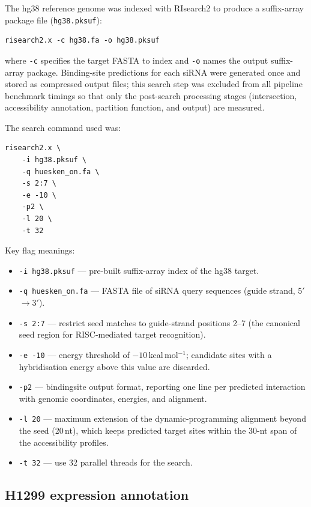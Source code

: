 \documentclass[11pt]{article}
\begin{document}
The hg38 reference genome was indexed with RIsearch2 to produce a suffix-array package file (\texttt{hg38.pksuf}):

\begin{verbatim}
risearch2.x -c hg38.fa -o hg38.pksuf
\end{verbatim}

\noindent where \texttt{-c} specifies the target FASTA to index and \texttt{-o} names the output suffix-array package.
Binding-site predictions for each siRNA were generated once and stored as compressed output files; this search step was excluded from all pipeline benchmark timings so that only the post-search processing stages (intersection, accessibility annotation, partition function, and output) are measured.

The search command used was:

\begin{verbatim}
risearch2.x \
    -i hg38.pksuf \
    -q huesken_on.fa \
    -s 2:7 \
    -e -10 \
    -p2 \
    -l 20 \
    -t 32
\end{verbatim}

\noindent Key flag meanings:
\begin{itemize}
  \item \texttt{-i hg38.pksuf} — pre-built suffix-array index of the
    hg38 target.
  \item \texttt{-q huesken\_on.fa} — FASTA file of siRNA query
    sequences (guide strand, 5$'$$\to$3$'$).
  \item \texttt{-s 2:7} — restrict seed matches to guide-strand positions
    2--7 (the canonical seed region for RISC-mediated target recognition).
  \item \texttt{-e -10} — energy threshold of $-10$\,kcal\,mol$^{-1}$;
    candidate sites with a hybridisation energy above this value are
    discarded.
  \item \texttt{-p2} — bindingsite output format, reporting one line per
    predicted interaction with genomic coordinates, energies, and alignment.
  \item \texttt{-l 20} — maximum extension of the dynamic-programming
    alignment beyond the seed (20\,nt), which keeps predicted target sites
    within the 30-nt span of the accessibility profiles.
  \item \texttt{-t 32} — use 32 parallel threads for the search.
\end{itemize}

\subsection{H1299 expression annotation}\label{sec:expression-annotation}
\end{document}
